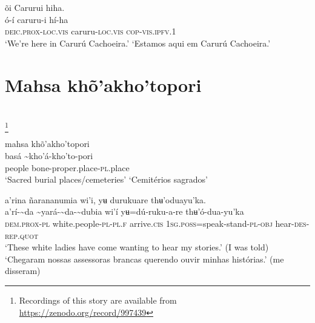 \documentclass[output=paper,
modfonts,nonflat
]{langsci/langscibook}
\begin{document}
\ea õi Carurui hiha.\\[.3em]
\gll {\textasciitilde}ó-í	caruru-i	hí-ha\\
     \textsc{deic.prox-loc.vis}	caruru-\textsc{loc.vis}	\textsc{cop-vis.ipfv.}1\\
\glt ‘We're here in Carurú Cachoeira.’
\glt ‘Estamos aqui em Carurú Cachoeira.’
\z

\largerpage
\section{Mahsa khõ'akho'topori}
\\
\footnote{Recordings of this story are available from \url{https://zenodo.org/record/997439}}

\ea  mahsa khõ'akho'topori\\[.3em]
\gll {\textasciitilde}basá {\textasciitilde}kho'á-kho'to-pori\\
     people bone-proper.place-\textsc{pl.}place\\
\glt ‘Sacred burial places/cemeteries’
\glt ‘Cemitérios sagrados’
\z 
  
\ea a’rina ñarananumia wi'i, yʉ durukuare thʉ'oduayu'ka.\\[.3em]
\gll a’rí-{\textasciitilde}da	{\textasciitilde}yará-{\textasciitilde}da-{\textasciitilde}dubia	wi'í	yʉ=dú-ruku-a-re	thʉ'ó-dua-yu'ka\\
     \textsc{dem.prox-pl}	white.people-\textsc{pl-pl.f}	arrive\textsc{.cis}	1\textsc{sg.poss}=speak-stand\textsc{-pl-obj}  	hear-\textsc{des-rep.quot}{\footnotemark}\\
\glt ‘These white ladies have come wanting to hear my stories.' (I was told)
\glt ‘Chegaram nossas assessoras brancas querendo ouvir minhas histórias.' (me disseram)
\z 
\end{document}
